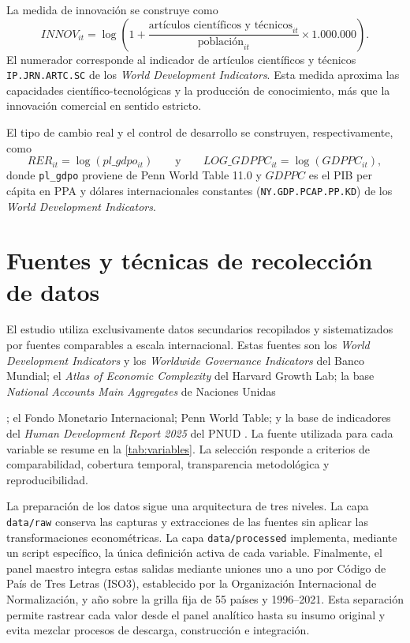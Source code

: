 \documentclass[../../TFM.tex]{subfiles}
\begin{document}
	La medida de innovación se construye como
	\[
		INNOV_{it}
		=
		\log\left(
			1
			+
			\frac{\text{artículos científicos y técnicos}_{it}}
			{\text{población}_{it}}
			\times 1.000.000
		\right).
	\]
	El numerador corresponde al indicador de artículos científicos y técnicos
	\nolinkurl{IP.JRN.ARTC.SC} de los \textit{World Development Indicators}. Esta
	medida aproxima las capacidades científico-tecnológicas y la producción de
	conocimiento, más que la innovación comercial en sentido estricto.

	El tipo de cambio real y el control de desarrollo se construyen,
	respectivamente, como
	\[
		RER_{it}=\log(pl\_gdpo_{it})
		\qquad\text{y}\qquad
		LOG\_GDPPC_{it}=\log(GDPPC_{it}),
	\]
	donde \texttt{pl\_gdpo} proviene de Penn World Table 11.0 y $GDPPC$ es el
	PIB per cápita en PPA y dólares internacionales constantes
	(\texttt{NY.GDP.PCAP.PP.KD}) de los \textit{World Development Indicators}.


	\section{Fuentes y técnicas de recolección de datos}
	\label{sec:recoleccion-datos}

	El estudio utiliza exclusivamente datos secundarios recopilados y
	sistematizados por fuentes comparables a escala internacional. Estas fuentes
	son los \textit{World Development Indicators} y los \textit{Worldwide
	Governance Indicators} del Banco Mundial; el \textit{Atlas of Economic
	Complexity} del Harvard Growth Lab; la base \textit{National Accounts Main
	Aggregates} de Naciones Unidas
	\colorbox{yellow!50}{\strut\parencite{UnitedNationsStatisticsDivision2026}}; el Fondo Monetario
	Internacional; Penn World Table; y la base de indicadores del \textit{Human
	Development Report 2025} del PNUD
	\parencite{UNDPUnitedNationsDevelopmentProgramme2025}. La fuente utilizada para
	cada variable se resume en la \autoref{tab:variables}. La selección responde a
	criterios de comparabilidad, cobertura temporal, transparencia metodológica y
	reproducibilidad.

	La preparación de los datos sigue una arquitectura de tres niveles. La capa
	\texttt{data/raw} conserva las capturas y extracciones de las fuentes sin
	aplicar las transformaciones econométricas. La capa
	\texttt{data/processed} implementa, mediante un script específico, la única
	definición activa de cada variable. Finalmente, el panel maestro integra
	estas salidas mediante uniones uno a uno por Código de País de Tres Letras
	(ISO3), establecido por la Organización Internacional de Normalización, y
	año sobre la grilla fija de 55 países y 1996--2021. Esta separación permite rastrear cada
	valor desde el panel analítico hasta su insumo original y evita mezclar
	procesos de descarga, construcción e integración.
\end{document}
